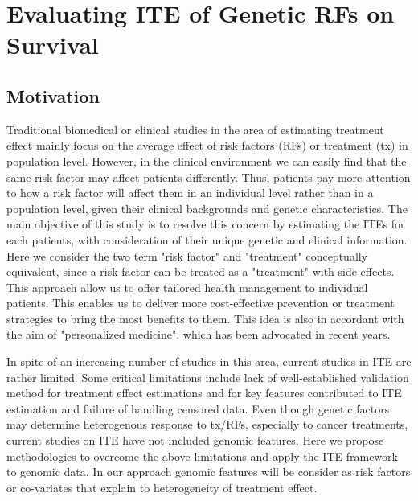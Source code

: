 \chapter{Evaluating ITE of Genetic RFs on Survival}
\label{chap:ite}

\section{Motivation}
\label{sec:ite_mot}
  Traditional biomedical or clinical studies in the area of estimating treatment effect mainly focus on the average effect of risk factors (RFs) or treatment (tx) in population level. However, in the clinical environment we can easily find that the same risk factor may affect patients differently. Thus, patients pay more attention to how a risk factor will affect them in an individual level rather than in a population level, given their clinical backgrounds and genetic characteristics. The main objective of this study is to resolve this concern by estimating the ITEs for each patients, with consideration of their unique genetic and clinical information. Here we consider the two term "risk factor" and "treatment" conceptually equivalent, since a risk factor can be treated as a "treatment" with side effects. This approach allow us to offer tailored health management to individual patients. This enables us to deliver more cost-effective prevention or treatment strategies to bring the most benefits to them. This idea is also in accordant with the aim of "personalized medicine", which has been advocated in recent years.

  In spite of an increasing number of studies in this area, current studies in ITE are rather limited. Some critical limitations include lack of well-established validation method for treatment effect estimations and for key features contributed to ITE estimation and failure of handling censored data. Even though genetic factors may determine heterogenous response to tx/RFs, especially to cancer treatments, current studies on ITE have not included genomic features. Here we propose methodologies to overcome the above limitations and apply the ITE framework to genomic data. In our approach genomic features will be consider as risk factors or co-variates that explain to heterogeneity of treatment effect.


